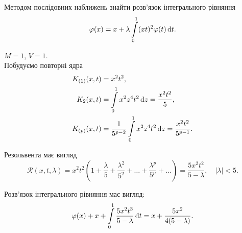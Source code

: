 \begin{example}
	Методом послідовних наближень знайти розв’язок інтегрального рівняння \[\varphi(x) = x + \lambda \displaystyle\int\limits_0^1 (xt)^2 \varphi(t) \mathop{}\!\mathrm{d} t.\]
\end{example}
\begin{solution*}
	$M = 1$, $V = 1$. \\

	Побудуємо повторні ядра 
	\begin{align*} 
		K_{(1)}(x, t) &= x^2t^2, \\
		K_2(x, t) &= \displaystyle\int\limits_0^1 x^2 z^4 t^2 \mathop{}\!\mathrm{d} z = \dfrac{x^2t^2}{5}, \\ 
		K_{(p)}(x, t) &= \dfrac{1}{5^{p - 2}} \displaystyle\int\limits_0^1 x^2 z^4 t^2 \mathop{}\!\mathrm{d} z = \dfrac{x^2t^2}{5^{p - 1}}.
	\end{align*}
	
	Резольвента має вигляд \[\mathcal{R}(x, t, \lambda) = x^2 t^2 \left(1 + \frac{\lambda}{5} + \frac{\lambda^2}{5^2} + \ldots + \frac{\lambda^p}{5^p} + \ldots \right) = \frac{5x^2t^2}{5 - \lambda}, \quad |\lambda| < 5. \]

	Розв’язок інтегрального рівняння має вигляд: \[ \varphi(x) + x + \displaystyle\int\limits_0^1 \dfrac{5x^2t^3}{5 - \lambda} \mathop{}\!\mathrm{d} t = x + \dfrac{5x^2}{4(5 - \lambda)}. \]
\end{solution*}